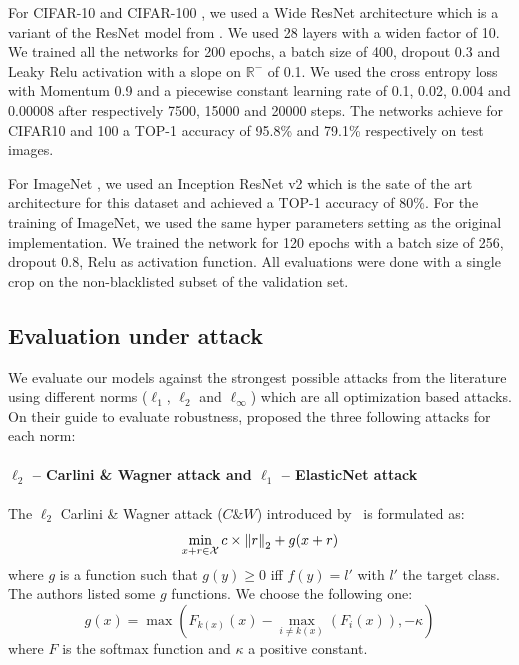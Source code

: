 For CIFAR-10 and CIFAR-100 \cite{krizhevsky2009learning}, we used a Wide ResNet architecture \cite{zagoruyko2016wide} which is a variant of the ResNet model from \cite{he2016deep}.
We used 28 layers with a widen factor of 10.
We trained all the networks for 200 epochs, a batch size of 400, dropout 0.3 and Leaky Relu activation with a slope on $\mathbb{R}^-$ of 0.1. We used the cross entropy loss with Momentum 0.9 and  a piecewise constant learning rate of 0.1, 0.02, 0.004 and 0.00008 after respectively 7500, 15000 and 20000 steps.
The networks achieve for CIFAR10 and 100 a TOP-1 accuracy of 95.8\% and 79.1\% respectively on test images. 

For ImageNet \cite{deng2009imagenet}, we used an Inception ResNet v2 \cite{szegedy2017inception} which is the sate of the art architecture for this dataset and achieved a TOP-1 accuracy of 80\%.
For the training of ImageNet, we used the same hyper parameters setting as the original implementation.
We trained the network for 120 epochs with a batch size of 256, dropout 0.8, Relu as activation function.
All evaluations were done with a single crop on the non-blacklisted subset of the validation set.


\subsection{Evaluation under attack}

We evaluate our models against the strongest possible attacks from the literature using different norms ($\ell_1$, $\ell_2$ and $\ell_\infty$) which are all optimization based attacks.
On their guide to evaluate robustness, \citet{carlini2019evaluating} proposed the three following attacks for each norm: 

\paragraph{$\ell_2$ -- Carlini \& Wagner attack and $\ell_1$ -- ElasticNet attack}
The $\ell_2$ Carlini \& Wagner attack ($C\&W$) introduced by~\citet{carlini2017towards} is formulated as:
\begin{equation}
  \min_{x+r\in \mathcal{X} } c \times \norm{r}_2+g(x+r)
\end{equation}
where $g$ is a function such that $g(y)\geq 0$ iff $f(y)=l'$ with $l'$ the target class.
The authors listed some $g$ functions.
We choose the following one:
\begin{equation}
  g(x)=\max(F_{k(x)}(x)-\max_{i\neq k(x)}(F_i(x)),-\kappa)
\end{equation}
where $F$ is the softmax function and $\kappa$ a positive constant.

